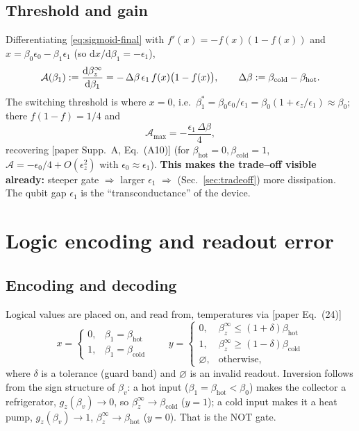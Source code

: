 \documentclass[11pt,a4paper]{article}
\renewcommand{\dd}{\mathrm{d}}
\newcommand{\gz}{g_z}
\theoremstyle{definition}
\theoremstyle{remark}
\begin{document}
\subsection{Threshold and gain}
Differentiating \eqref{eq:sigmoid-final} with $f'(x)=-f(x)(1-f(x))$ and
$x=\beta_0\epsilon_0-\beta_1\epsilon_1$ (so $\dd x/\dd\beta_1=-\epsilon_1$),
\begin{equation}
\mathcal{A}(\beta_1):=\dv{\beta_z^\infty}{\beta_1}
= -\,\Delta\beta\,\epsilon_1\,f(x)\big(1-f(x)\big),\qquad
\Delta\beta:=\beta_{\mathrm{cold}}-\beta_{\mathrm{hot}}.
\end{equation}
The switching threshold is where $x=0$, i.e.\
$\beta_1^\ast=\beta_0\epsilon_0/\epsilon_1
=\beta_0(1+\epsilon_z/\epsilon_1)\approx\beta_0$; there $f(1-f)=1/4$ and
\begin{equation}
\mathcal{A}_{\max}=-\frac{\epsilon_1\,\Delta\beta}{4},
\label{eq:gain}
\end{equation}
recovering [paper Supp.~A, Eq.~(A10)] (for $\beta_{\mathrm{hot}}=0,
\beta_{\mathrm{cold}}=1$, $\mathcal{A}=-\epsilon_0/4+O(\epsilon_z^2)$
with $\epsilon_0\approx\epsilon_1$). \textbf{This makes the trade--off
visible already:} steeper gate $\Rightarrow$ larger $\epsilon_1$
$\Rightarrow$ (Sec.~\ref{sec:tradeoff}) more dissipation. The qubit gap
$\epsilon_1$ is the ``transconductance'' of the device.

\section{Logic encoding and readout error}
\label{sec:logic}
\subsection{Encoding and decoding}
Logical values are placed on, and read from, temperatures via [paper
Eq.~(24)]
\begin{equation}
x=\begin{cases}0,&\beta_1=\beta_{\mathrm{hot}}\\
1,&\beta_1=\beta_{\mathrm{cold}}\end{cases}
\qquad
y=\begin{cases}
0,&\beta_z^\infty\le(1+\delta)\beta_{\mathrm{hot}}\\
1,&\beta_z^\infty\ge(1-\delta)\beta_{\mathrm{cold}}\\
\varnothing,&\text{otherwise,}\end{cases}
\label{eq:encoding}
\end{equation}
where $\delta$ is a tolerance (guard band) and $\varnothing$ is an
invalid readout. Inversion follows from the sign structure of $\beta_v$:
a hot input ($\beta_1=\beta_{\mathrm{hot}}<\beta_0$) makes the collector
a refrigerator, $\gz(\beta_v)\to0$, so
$\beta_z^\infty\to\beta_{\mathrm{cold}}$ ($y=1$); a cold input makes it a
heat pump, $\gz(\beta_v)\to1$, $\beta_z^\infty\to\beta_{\mathrm{hot}}$
($y=0$). That is the NOT gate.
\end{document}
